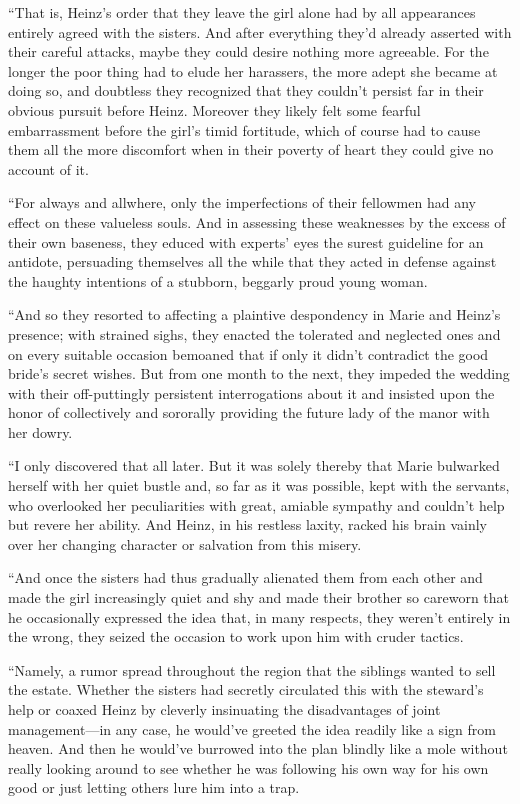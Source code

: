 \documentclass[12pt,a4paper]{article}
\begin{document}
“That is, Heinz’s order that they leave the girl alone had by all appearances entirely agreed with the sisters. And after everything they’d already asserted with their careful attacks, maybe they could desire nothing more agreeable. For the longer the poor thing had to elude her harassers, the more adept she became at doing so, and doubtless they recognized that they couldn’t persist far in their obvious pursuit before Heinz. Moreover they likely felt some fearful embarrassment before the girl’s timid fortitude, which of course had to cause them all the more discomfort when in their poverty of heart they could give no account of it.

“For always and allwhere, only the imperfections of their fellowmen had any effect on these valueless souls. And in assessing these weaknesses by the excess of their own baseness, they educed with experts’ eyes the surest guideline for an antidote, persuading themselves all the while that they acted in defense against the haughty intentions of a stubborn, beggarly proud young woman.

“And so they resorted to affecting a plaintive despondency in Marie and Heinz’s presence; with strained sighs, they enacted the tolerated and neglected ones and on every suitable occasion bemoaned that if only it didn’t contradict the good bride’s secret wishes. But from one month to the next, they impeded the wedding with their off-puttingly persistent interrogations about it and insisted upon the honor of collectively and sororally providing the future lady of the manor with her dowry.

“I only discovered that all later. But it was solely thereby that Marie bulwarked herself with her quiet bustle and, so far as it was possible, kept with the servants, who overlooked her peculiarities with great, amiable sympathy and couldn’t help but revere her ability. And Heinz, in his restless laxity, racked his brain vainly over her changing character or salvation from this misery.

“And once the sisters had thus gradually alienated them from each other and made the girl increasingly quiet and shy and made their brother so careworn that he occasionally expressed the idea that, in many respects, they weren’t entirely in the wrong, they seized the occasion to work upon him with cruder tactics.

“Namely, a rumor spread throughout the region that the siblings wanted to sell the estate. Whether the sisters had secretly circulated this with the steward’s help or coaxed Heinz by cleverly insinuating the disadvantages of joint management—in any case, he would’ve greeted the idea readily like a sign from heaven. And then he would’ve burrowed into the plan blindly like a mole without really looking around to see whether he was following his own way for his own good or just letting others lure him into a trap.
\end{document}
